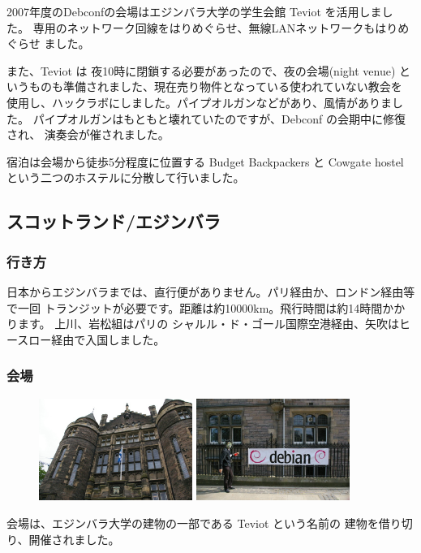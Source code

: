 \documentclass[mingoth,a4paper]{jsarticle}
\begin{document}
2007年度のDebconfの会場はエジンバラ大学の学生会館 Teviot を活用しました。
専用のネットワーク回線をはりめぐらせ、無線LANネットワークもはりめぐらせ
ました。

また、Teviot は 夜10時に閉鎖する必要があったので、夜の会場(night venue) 
というものも準備されました、現在売り物件となっている使われていない教会を
使用し、ハックラボにしました。パイプオルガンなどがあり、風情がありました。
パイプオルガンはもともと壊れていたのですが、Debconf の会期中に修復され、
演奏会が催されました。

宿泊は会場から徒歩5分程度に位置する Budget Backpackers と Cowgate hostel 
という二つのホステルに分散して行いました。

\subsection{スコットランド/エジンバラ}

\subsubsection{行き方}
  日本からエジンバラまでは、直行便がありません。パリ経由か、ロンドン経由等で一回
  トランジットが必要です。距離は約10000km。飛行時間は約14時間かかります。
  上川、岩松組はパリの シャルル・ド・ゴール国際空港経由、矢吹はヒースロー経由で入国しました。

\subsubsection{会場}

\begin{figure}
  \includegraphics[width=5cm]{image200706/teviot.jpg}
  \includegraphics[width=5cm]{image200706/debconf7-debian.jpg}
\end{figure}
  会場は、エジンバラ大学の建物の一部である Teviot という名前の
  建物を借り切り、開催されました。
\end{document}
